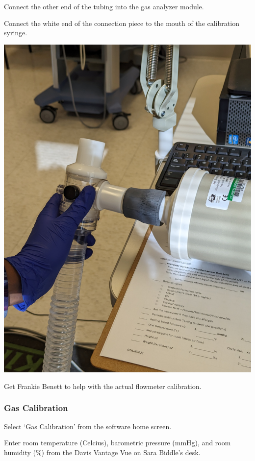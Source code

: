 \documentclass[
]{book}
\begin{document}
Connect the other end of the tubing into the gas analyzer module.

Connect the white end of the connection piece to the mouth of the calibration syringe.

\includegraphics[width=1\linewidth]{images/parvocalibration/connect_syringe}

Get Frankie Benett to help with the actual flowmeter calibration.

\hypertarget{Parvo-Calibration-Gas}{%
\subsubsection{Gas Calibration}\label{Parvo-Calibration-Gas}}

Select `Gas Calibration' from the software home screen.

Enter room temperature (Celcius), barometric pressure (mmHg), and room humidity (\%) from the Davis Vantage Vue on Sara Biddle's desk.
\end{document}

